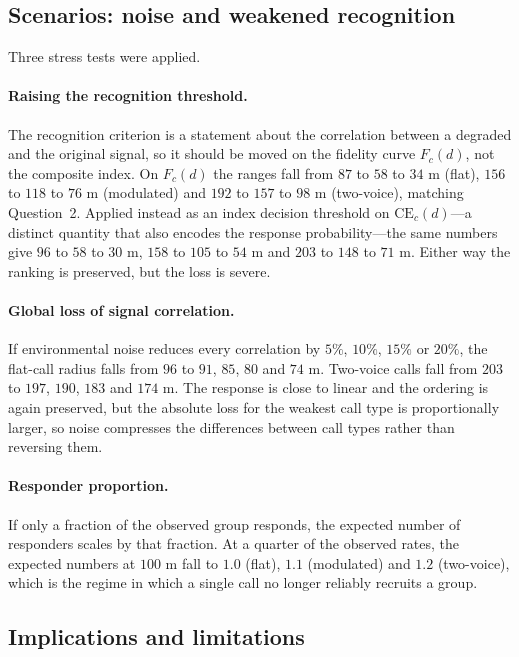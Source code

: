 \documentclass{apmcmthesis}
\begin{document}
\subsection{Scenarios: noise and weakened recognition}

Three stress tests were applied.

\paragraph{Raising the recognition threshold.} The recognition criterion is a statement
about the correlation between a degraded and the original signal, so it should be moved on
the fidelity curve $F_c(d)$, not the composite index. On $F_c(d)$ the ranges fall from $87$
to $58$ to $34$ m (flat), $156$ to $118$ to $76$ m (modulated) and $192$ to $157$ to $98$ m
(two-voice), matching Question~2. Applied instead as an index decision threshold on
$\mathrm{CE}_c(d)$---a distinct quantity that also encodes the response probability---the
same numbers give $96$ to $58$ to $30$ m, $158$ to $105$ to $54$ m and $203$ to $148$ to
$71$ m. Either way the ranking is preserved, but the loss is severe.

\paragraph{Global loss of signal correlation.} If environmental noise reduces every
correlation by $5\%$, $10\%$, $15\%$ or $20\%$, the flat-call radius falls from $96$ to
$91$, $85$, $80$ and $74$ m. Two-voice calls fall from $203$ to $197$, $190$, $183$ and
$174$ m. The response is close to linear and the ordering is again preserved, but the
absolute loss for the weakest call type is proportionally larger, so noise compresses the
differences between call types rather than reversing them.

\paragraph{Responder proportion.} If only a fraction of the observed group responds,
the expected number of responders scales by that fraction. At a quarter of the observed
rates, the expected numbers at $100$ m fall to $1.0$ (flat), $1.1$ (modulated) and $1.2$
(two-voice), which is the regime in which a single call no longer reliably recruits a
group.

\subsection{Implications and limitations}
\end{document}
